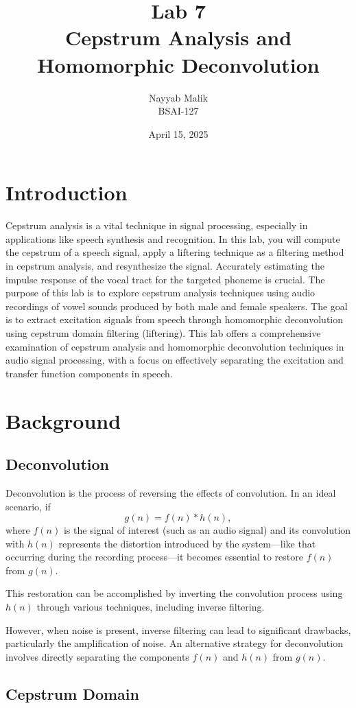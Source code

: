 \documentclass[a4paper,12pt]{article}
\title{\textbf{Lab 7 \\ Cepstrum Analysis and Homomorphic Deconvolution}}
\author{Nayyab Malik\\BSAI-127}
\date{April 15, 2025}
\begin{document}
\maketitle
\tableofcontents
\newpage

\section{Introduction}
Cepstrum analysis is a vital technique in signal processing, especially in applications like speech synthesis
and recognition. In this lab, you will compute the cepstrum of a speech signal, apply a liftering technique
as a filtering method in cepstrum analysis, and resynthesize the signal. Accurately estimating the impulse
response of the vocal tract for the targeted phoneme is crucial.
The purpose of this lab is to explore cepstrum analysis techniques using audio recordings of vowel
sounds produced by both male and female speakers. The goal is to extract excitation signals from
speech through homomorphic deconvolution using cepstrum domain filtering (liftering). This lab offers
a comprehensive examination of cepstrum analysis and homomorphic deconvolution techniques in audio
signal processing, with a focus on effectively separating the excitation and transfer function components
in speech.
\section{Background}
\subsection{Deconvolution}
Deconvolution is the process of reversing the effects of convolution. In an ideal scenario, if 
\[
g(n) = f(n) * h(n),
\]
where \( f(n) \) is the signal of interest (such as an audio signal) and its convolution with \( h(n) \) represents the distortion introduced by the system—like that occurring during the recording process—it becomes essential to restore \( f(n) \) from \( g(n) \).

This restoration can be accomplished by inverting the convolution process using \( h(n) \) through various techniques, including inverse filtering.

However, when noise is present, inverse filtering can lead to significant drawbacks, particularly the amplification of noise. An alternative strategy for deconvolution involves directly separating the components \( f(n) \) and \( h(n) \) from \( g(n) \).
\subsection{Cepstrum Domain}
\end{document}
